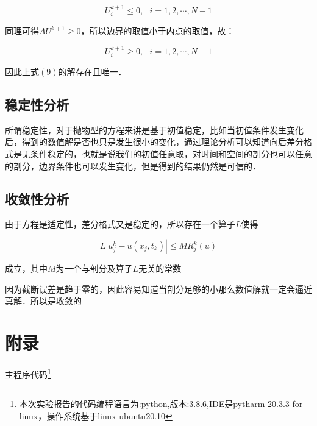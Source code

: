 \documentclass[UTF8]{ctexart}
\begin{document}
\[U_i^{k+1} \leq 0,~~~ i = 1,2,\cdots,N-1\]

同理可得$AU^{k+1} \geq 0$，所以边界的取值小于内点的取值，故：

\[U_i^{k+1} \geq 0,~~~i =1,2,\cdots,N-1\]

因此上式$(9)$的解存在且唯一．

\subsection{稳定性分析}

所谓稳定性，对于抛物型的方程来讲是基于初值稳定，比如当初值条件发生变化后，得到的数值解是否也只是发生很小的变化，通过理论分析可以知道向后差分格式是无条件稳定的，也就是说我们的初值任意取，对时间和空间的剖分也可以任意的剖分，边界条件也可以发生变化，但是得到的结果仍然是可信的．

\subsection{收敛性分析}

由于方程是适定性，差分格式又是稳定的，所以存在一个算子$L$使得

\begin{equation}
L\left| u_j^k - u(x_j,t_k) \right| \leq MR_j^k(u)
\end{equation}

成立，其中$M$为一个与剖分及算子$L$无关的常数

因为截断误差是趋于零的，因此容易知道当剖分足够的小那么数值解就一定会逼近真解．所以是收敛的

\section{附录}

主程序代码\footnote{本次实验报告的代码编程语言为:python,版本:3.8.6,IDE是pytharm 20.3.3 for linux，操作系统基于linux-ubuntu20.10}
\end{document}
